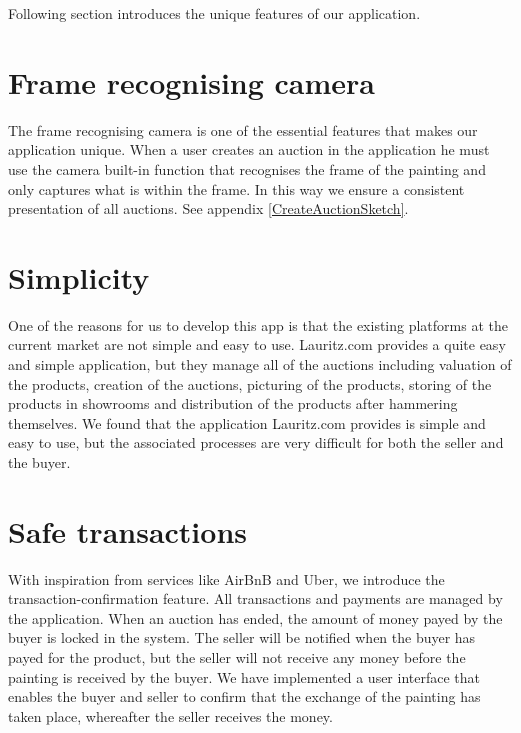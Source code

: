 Following section introduces the unique features of our application. 

\section*{Frame recognising camera}
The frame recognising camera is one of the essential features that makes our application unique. When a user creates an auction in the application he must use the camera built-in function that recognises the frame of the painting and only captures what is within the frame. In this way we ensure a consistent presentation of all auctions. See appendix \ref{CreateAuctionSketch}.

\section*{Simplicity}
One of the reasons for us to develop this app is that the existing platforms at the current market are not simple and easy to use. Lauritz.com provides a quite easy and simple application, but they manage all of the auctions including valuation of the products, creation of the auctions, picturing of the products, storing of the products in showrooms and distribution of the products after hammering themselves. We found that the application Lauritz.com provides is simple and easy to use, but the associated processes are very difficult for both the seller and the buyer.

\section*{Safe transactions}
With inspiration from services like AirBnB and Uber, we introduce the transaction-confirmation feature. All transactions and payments are managed by the application. When an auction has ended, the amount of money payed by the buyer is locked in the system. The seller will be notified when the buyer has payed for the product, but the seller will not receive any money before the painting is received by the buyer. We have implemented a user interface that enables the buyer and seller to confirm that the exchange of the painting has taken place, whereafter the seller receives the money.  